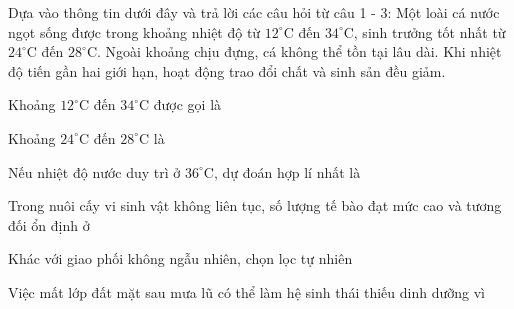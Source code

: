 \begin{baidoc}
\item[] Dựa vào thông tin dưới đây và trả lời các câu hỏi từ câu 1 - 3:
Một loài cá nước ngọt sống được trong khoảng nhiệt độ từ $12^\circ$C đến $34^\circ$C, sinh trưởng tốt nhất từ $24^\circ$C đến $28^\circ$C. Ngoài khoảng chịu đựng, cá không thể tồn tại lâu dài. Khi nhiệt độ tiến gần hai giới hạn, hoạt động trao đổi chất và sinh sản đều giảm.

\begin{ex}
Khoảng $12^\circ$C đến $34^\circ$C được gọi là
\end{ex}

\begin{ex}
Khoảng $24^\circ$C đến $28^\circ$C là
\end{ex}

\begin{ex}
Nếu nhiệt độ nước duy trì ở $36^\circ$C, dự đoán hợp lí nhất là
\end{ex}
\end{baidoc}

\begin{ex}
Trong nuôi cấy vi sinh vật không liên tục, số lượng tế bào đạt mức cao và tương đối ổn định ở
\end{ex}

\begin{ex}
Khác với giao phối không ngẫu nhiên, chọn lọc tự nhiên
\end{ex}

\begin{ex}
Việc mất lớp đất mặt sau mưa lũ có thể làm hệ sinh thái thiếu dinh dưỡng vì
\end{ex}

